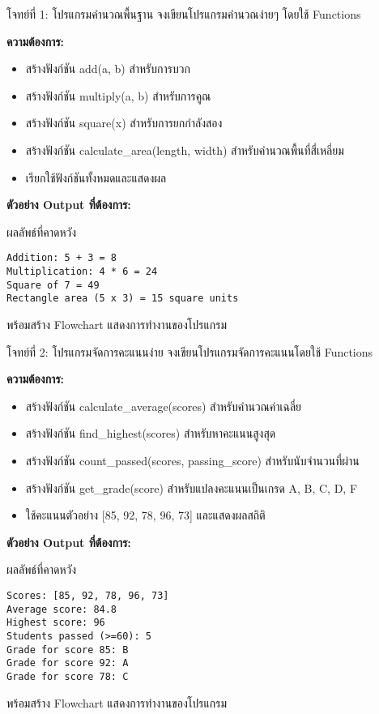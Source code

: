 \documentclass[12pt,a4paper]{article}
\newcommand{\textlight}[1]{{\thailightfont #1}}
\begin{document}
\begin{exercisebox}{โจทย์ที่ 1: โปรแกรมคำนวณพื้นฐาน}
\textlight{จงเขียนโปรแกรมคำนวณง่ายๆ โดยใช้ Functions}

\textlight{\textbf{ความต้องการ:}}
\begin{itemize}
    \item \textlight{สร้างฟังก์ชัน add(a, b) สำหรับการบวก}
    \item \textlight{สร้างฟังก์ชัน multiply(a, b) สำหรับการคูณ}
    \item \textlight{สร้างฟังก์ชัน square(x) สำหรับการยกกำลังสอง}
    \item \textlight{สร้างฟังก์ชัน calculate\_area(length, width) สำหรับคำนวณพื้นที่สี่เหลี่ยม}
    \item \textlight{เรียกใช้ฟังก์ชันทั้งหมดและแสดงผล}
\end{itemize}

\textlight{\textbf{ตัวอย่าง Output ที่ต้องการ:}}
\begin{codebox}{ผลลัพธ์ที่คาดหวัง}
\begin{lstlisting}[style=python]
Addition: 5 + 3 = 8
Multiplication: 4 * 6 = 24
Square of 7 = 49
Rectangle area (5 x 3) = 15 square units
\end{lstlisting}
\end{codebox}
\textlight{พร้อมสร้าง Flowchart แสดงการทำงานของโปรแกรม}
\end{exercisebox}

\begin{exercisebox}{โจทย์ที่ 2: โปรแกรมจัดการคะแนนง่าย}
\textlight{จงเขียนโปรแกรมจัดการคะแนนโดยใช้ Functions}

\textlight{\textbf{ความต้องการ:}}
\begin{itemize}
    \item \textlight{สร้างฟังก์ชัน calculate\_average(scores) สำหรับคำนวณค่าเฉลี่ย}
    \item \textlight{สร้างฟังก์ชัน find\_highest(scores) สำหรับหาคะแนนสูงสุด}
    \item \textlight{สร้างฟังก์ชัน count\_passed(scores, passing\_score) สำหรับนับจำนวนที่ผ่าน}
    \item \textlight{สร้างฟังก์ชัน get\_grade(score) สำหรับแปลงคะแนนเป็นเกรด A, B, C, D, F}
    \item \textlight{ใช้คะแนนตัวอย่าง [85, 92, 78, 96, 73] และแสดงผลสถิติ}
\end{itemize}

\textlight{\textbf{ตัวอย่าง Output ที่ต้องการ:}}
\begin{codebox}{ผลลัพธ์ที่คาดหวัง}
\begin{lstlisting}[style=python]
Scores: [85, 92, 78, 96, 73]
Average score: 84.8
Highest score: 96
Students passed (>=60): 5
Grade for score 85: B
Grade for score 92: A
Grade for score 78: C
\end{lstlisting}
\end{codebox}
\textlight{พร้อมสร้าง Flowchart แสดงการทำงานของโปรแกรม}
\end{exercisebox}
\end{document}
